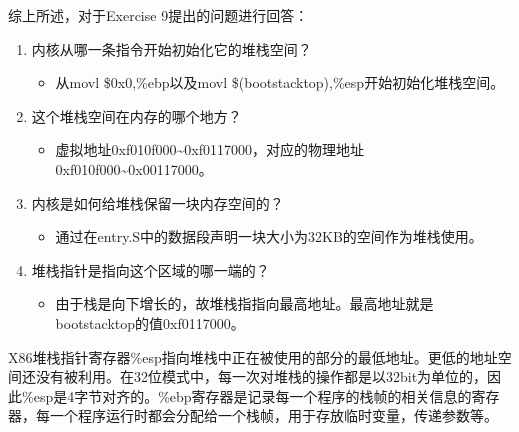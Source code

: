 \begin{exerciseSolution}{9}
    \par 综上所述，对于Exercise 9提出的问题进行回答：
    \begin{enumerate}
        \item 内核从哪一条指令开始初始化它的堆栈空间？
            \begin{itemize}
                \item 从movl \$0x0,\%ebp以及movl \$(bootstacktop),\%esp开始初始化堆栈空间。
            \end{itemize}
        \item 这个堆栈空间在内存的哪个地方？
            \begin{itemize}
                \item 虚拟地址0xf010f000\textasciitilde 0xf0117000，对应的物理地址0xf010f000\textasciitilde 0x00117000。
            \end{itemize}
        \item 内核是如何给堆栈保留一块内存空间的？
            \begin{itemize}
                \item 通过在entry.S中的数据段声明一块大小为32KB的空间作为堆栈使用。
            \end{itemize}
        \item 堆栈指针是指向这个区域的哪一端的？
            \begin{itemize}
                \item 由于栈是向下增长的，故堆栈指指向最高地址。最高地址就是bootstacktop的值0xf0117000。
            \end{itemize}
    \end{enumerate}
\end{exerciseSolution}

\par X86堆栈指针寄存器\%esp指向堆栈中正在被使用的部分的最低地址。更低的地址空间还没有被利用。在32位模式中，每一次对堆栈的操作都是以32bit为单位的，因此\%esp是4字节对齐的。\%ebp寄存器是记录每一个程序的栈帧的相关信息的寄存器，每一个程序运行时都会分配给一个栈帧，用于存放临时变量，传递参数等。

